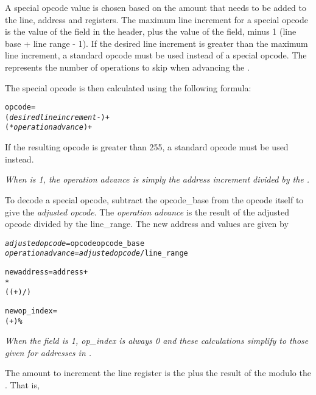 A special opcode value is chosen based on the amount that needs
to be added to the line, address and  registers.
The
maximum line increment for a special opcode is the value
of the 
field in the header, plus the value of the 
 field, minus 1 (line base + 
line range - 1). 
If the desired line increment is greater than the maximum
line increment, a standard opcode must be used instead of a
special opcode. The  represents the number
of operations to skip when advancing the .

The special opcode is then calculated using the following formula:
\begin{alltt}
  opcode = 
    (\textit{desired line increment} - ) +
      ( * \textit{operation advance}) + 
\end{alltt}
If the resulting opcode is greater than 255, a standard opcode
must be used instead.

\textit{When  is 1, the operation
advance is simply the address increment divided by the
.}

To decode a special opcode, subtract the opcode\_base from
the opcode itself to give the \textit{adjusted opcode}. 
The \textit{operation advance} 
is the result of the adjusted opcode divided by the
line\_range. The new address and  values
are given by
\begin{alltt}
  \textit{adjusted opcode} = opcode \dash opcode\_base
  \textit{operation advance} = \textit{adjusted opcode} / line\_range

  new address = address +
     *
      (( + ) / )

  new op\_index =
    ( + ) \% 
\end{alltt}

\textit{When the  field is 1,
op\_index is always 0 and these calculations simplify to those
given for addresses in 
.}

The amount to increment the line register is the 
 plus
the result of the 
 modulo the 
. That
is,

